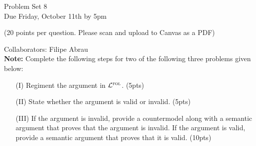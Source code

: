 \documentclass[12pt]{article}
\newcommand{\FOL}{\mathcal{L}^{\textsc{fol}}} %
\begin{document}
\thispagestyle{empty}

\begin{center}
  \Large Problem Set 8\\[1ex] 
  Due Friday, October 11th by 5pm
  \vspace{.15in}

  \normalsize{(20 points per question. Please scan and upload to Canvas as a PDF)}\\[3ex] 
\end{center}

Collaborators: Filipe Abrau\\

\textbf{Note:} Complete the following steps for two of the following three problems given below:

\begin{enumerate}
  \item[(I)] Regiment the argument in $\FOL$. (5pts)
  \item[(II)] State whether the argument is valid or invalid. (5pts) 
  \item[(III)] If the argument is invalid, provide a countermodel along with a semantic argument that proves that the argument is invalid. If the argument is valid, provide a semantic argument that proves that it is valid. (10pts)
\end{enumerate}
\end{document}
